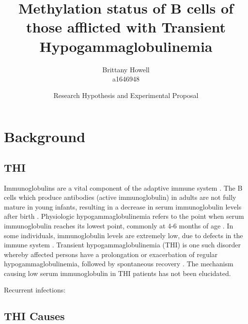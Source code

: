 \documentclass[12pt]{article}
\title{Methylation status of B cells of those afflicted with Transient Hypogammaglobulinemia}
\date{Research Hypothesis and Experimental Proposal}
\author{Brittany Howell \\ a1646948}
\begin{document}
	\maketitle
	
	\section{Background}
		
		\subsection{THI}
	
		Immunoglobulins are a vital component of the adaptive immune system \citep{Simon15}.  
		The B cells which produce antibodies (active immunoglobulin) in adults are not fully mature in young infants, resulting in a decrease in serum immunoglobulin levels after birth \citep{Martin10, Rechavi15}. 
		Physiologic hypogammaglobulinemia refers to the point when serum immunoglobulin reaches its lowest point, commonly at 4-6 months of age \citep{Dressler89}. 
		In some individuals, immunoglobulin levels are extremely low, due to defects in the immune system \citep{AlHerz14}. 
		Transient hypogammaglobulinemia (THI) is one such disorder whereby affected persons have a prolongation or exacerbation of regular hypogammaglobulinemia, followed by spontaneous recovery \citep{Gitlin56,Rosen66,Tiller78,Buckley83,McGeady87,Dressler89,Dalal98,AlHerz11,AlHerz14}.
		The mechanism causing low serum immunoglobulin in THI patients has not been elucidated.
		
	
%	
	
	Recurrent infections: \citep{Rosen66}
		\subsection{THI Causes}
			
\end{document}
